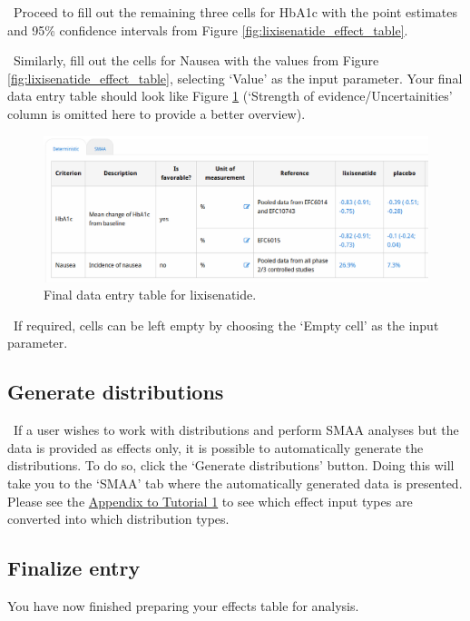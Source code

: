 \documentclass[00_mcda_tutorial.tex]{subfiles}
\begin{document}
\noindent \leftpointright \, Proceed to fill out the remaining three cells for HbA1c with the point estimates and 95\% confidence intervals from Figure \ref{fig:lixisenatide_effect_table}.
\newline

\noindent \leftpointright \, Similarly, fill out the cells for Nausea with the values from Figure \ref{fig:lixisenatide_effect_table}, selecting ‘Value’ as the input parameter. Your final data entry table should look like Figure \ref{fig:dataFinished} (‘Strength of evidence/Uncertainities’ column is omitted here to provide a better overview).

\begin{figure}[!h]
    \centering
	\includegraphics[width=\textwidth]{fig/effectsInputDone.png}
    \caption{Final data entry table for lixisenatide.}
	\label{fig:dataFinished}
\end{figure}

\noindent \faLightbulbO \, If required, cells can be left empty by choosing the ‘Empty cell’ as the input parameter.

\subsection*{Generate distributions}
\noindent \leftpointright \, If a user wishes to work with distributions and perform SMAA analyses but the data is provided as effects only, it is possible to automatically generate the distributions. To do so, click the ‘Generate distributions’ button. Doing this will take you to the ‘SMAA’ tab where the automatically generated data is presented. Please see the \hyperref[appendix1]{Appendix to Tutorial 1} to see which effect input types are converted into which distribution types.

\subsection*{Finalize entry}
You have now finished preparing your effects table for analysis.
\newline
\end{document}
